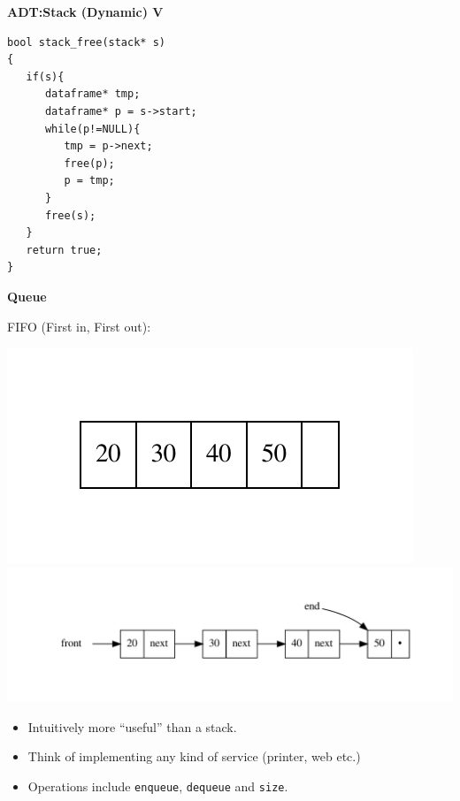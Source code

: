 \documentclass[a4,portraitt]{slides}
\begin{document}
\newpage
{\samepage
\begin{center}
{\Large{\bf ADT:Stack (Dynamic) V}}
\end{center}
\begin{verbatim}
bool stack_free(stack* s)
{
   if(s){
      dataframe* tmp;
      dataframe* p = s->start;
      while(p!=NULL){
         tmp = p->next;
         free(p);
         p = tmp;
      }
      free(s);
   }
   return true;
}
\end{verbatim}
}





\newpage
{\samepage
\begin{center}
{\Large{\bf Queue}}
\end{center}
FIFO (First in, First out):
\begin{center}
\includegraphics{../Images/Fixedq.pdf}
\includegraphics[width=\textwidth]{../Images/Linkedq.pdf}
\end{center}
\begin{itemize}
\item Intuitively more ``useful'' than a stack.
\item Think of implementing any kind of service (printer, web etc.)
\item Operations include \verb^enqueue^, \verb^dequeue^ and \verb^size^.
\end{itemize}
}
\end{document}
